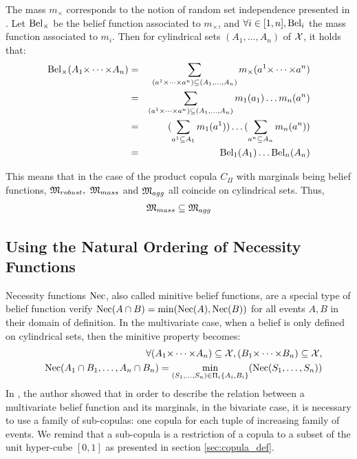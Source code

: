 The mass $m_\times$ corresponds to the notion of random set independence presented in \cite{dempster_upper_1967, couso_survey_2000}. Let ${\mathrm{Bel}}_\times$ be the belief function associated to $m_\times$, and $\forall i\in[1,n], {\mathrm{Bel}}_i$ the mass function associated to $m_i$. Then for cylindrical sets $(A_1, \dots, A_n)$ of ${\mathcal{X}}$, it holds that:
\begin{eqnarray}
    {\mathrm{Bel}}_\times(A_1{\times\dots\times} A_n) &=& \sum_{(a^1{\times\dots\times} a^n)\subseteq (A_1, \dots, A_n)}m_\times(a^1{\times\dots\times} a^n)\nonumber\\
    &=& \sum_{(a^1{\times\dots\times} a^n)\subseteq (A_1, \dots, A_n)}m_1(a_1)\dots m_n(a^n)\nonumber\\
    &=& (\sum_{a^1\subseteq A_1}m_1(a^1))\dots(\sum_{a^n\subseteq A_n}m_n(a^n))\nonumber\\
    &=& {\mathrm{Bel}}_1(A_1)\dots {\mathrm{Bel}}_n(A_n)
\end{eqnarray}

This means that in the case of the product copula $C_\Pi$ with marginals being belief functions, ${\mathfrak{M}}_{robust},~{\mathfrak{M}}_{mass}$ and ${\mathfrak{M}}_{agg}$ all coincide on cylindrical sets. Thus,
\begin{eqnarray*}
    {\mathfrak{M}}_{mass}\subseteq{\mathfrak{M}}_{agg}
\end{eqnarray*}

\subsection{Using the Natural Ordering of Necessity Functions}\label{subsec:necessity_functions}
Necessity functions ${\mathrm{Nec}}$, also called minitive belief functions, are a special type of belief function verify ${\mathrm{Nec}}(A\cap B) =\min({\mathrm{Nec}}(A), {\mathrm{Nec}}(B))$ for all events $A, B$ in their domain of definition. In the multivariate case, when a belief is only defined on cylindrical sets, then the minitive property becomes:
\begin{eqnarray}
    &&\forall (A_1{\times\dots\times} A_n)\subseteq{\mathcal{X}}, (B_1{\times\dots\times} B_n)\subseteq{\mathcal{X}},\nonumber\\
    &&{\mathrm{Nec}}(A_1\cap B_1,\dots, A_n\cap B_n) = \min_{(S_1,\dots,S_n)\in\Pi_i\{A_i,B_i\}}({\mathrm{Nec}}(S_1, \dots, S_n))
\end{eqnarray}
In \cite{schmelzer_joint_2015}, the author showed that in order to describe the relation between a multivariate belief function and its marginals, in the bivariate case, it is necessary to use a family of sub-copulas: one copula for each tuple of increasing family of events. We remind that a sub-copula is a restriction of a copula to a subset of the unit hyper-cube $[0,1]$ as presented in section \ref{sec:copula_def}.

